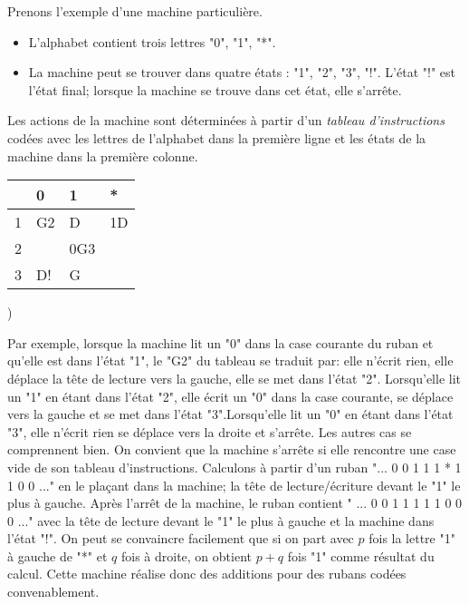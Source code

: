 Prenons l'exemple d'une machine particulière.
\begin{itemize}
  \item L'alphabet contient trois lettres "0", "1", "*".
  \item La machine peut se trouver dans quatre états : "1", "2", "3", "!". L'état "!" est l'état final; lorsque la machine se trouve dans cet état, elle s'arrête. 
\end{itemize}
Les actions de la machine sont déterminées à partir d'un \emph{tableau d'instructions} codées avec les lettres de l'alphabet dans la première ligne et les états de la machine dans la première colonne.
\begin{center}
\renewcommand{\arraystretch}{1.5}
\begin{tabular}{|l|l|l|l|} \hline
  & 0  & 1   & *  \\ \hline
1 & G2 & D   & 1D \\ \hline
2 &    & 0G3 &    \\ \hline
3 & D! & G   &    \\ \hline
\end{tabular}
) \end{center}
Par exemple, lorsque la machine lit un "0" dans la case courante du ruban et qu'elle est dans l'état "1", le "G2" du tableau se traduit par: elle n'écrit rien, elle déplace la tête de lecture vers la gauche, elle se met dans l'état "2".\newline
Lorsqu'elle lit un "1" en étant dans l'état "2", elle écrit un "0" dans la case courante, se déplace vers la gauche et se met dans l'état "3".\newline Lorsqu'elle lit un "0" en étant dans l'état "3", elle n'écrit rien se déplace vers la droite et s'arrête. Les autres cas se comprennent bien. On convient que la machine s'arrête si elle rencontre une case vide de son tableau d'instructions.\newline
Calculons à partir d'un ruban "... 0 0 1 1 1 * 1 1 0 0 ..." en le plaçant dans la machine; la tête de lecture/écriture devant le "1" le plus à gauche.\newline
Après l'arrêt de la machine, le ruban contient " ... 0 0 1 1 1 1 1 0 0 0 ..." avec la tête de lecture devant le "1" le plus à gauche et la machine dans l'état "!".\newline
On peut se convaincre facilement que si on part avec $p$ fois la lettre "1" à gauche de "*" et $q$ fois à droite, on obtient $p+q$ fois "1" comme résultat du calcul. Cette machine réalise donc des additions pour des rubans codées convenablement.

